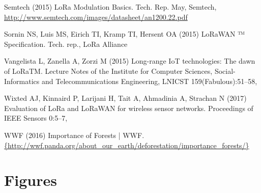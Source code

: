 \begin{thebibliography}{19}
Semtech (2015) {LoRa Modulation Basics}. Tech. Rep. May, Semtech,
  \urlprefix\url{http://www.semtech.com/images/datasheet/an1200.22.pdf}

Sornin NS, Luis MS, Eirich TI, Kramp TI, Hersent OA (2015) {LoRaWAN ™
  Specification}. Tech. rep., LoRa Alliance

Vangelista L, Zanella A, Zorzi M (2015) {Long-range IoT technologies: The dawn
  of LoRaTM}. Lecture Notes of the Institute for Computer Sciences,
  Social-Informatics and Telecommunications Engineering, LNICST
  159(Fabulous):51--58, 

Wixted AJ, Kinnaird P, Larijani H, Tait A, Ahmadinia A, Strachan N (2017)
  {Evaluation of LoRa and LoRaWAN for wireless sensor networks}. Proceedings of
  IEEE Sensors 0:5--7, 

WWF (2016) {Importance of Forests | WWF}.
  \urlprefix\url{{http://wwf.panda.org/about_our_earth/deforestation/importance_forests/}}

\end{thebibliography}


\section*{Figures}

